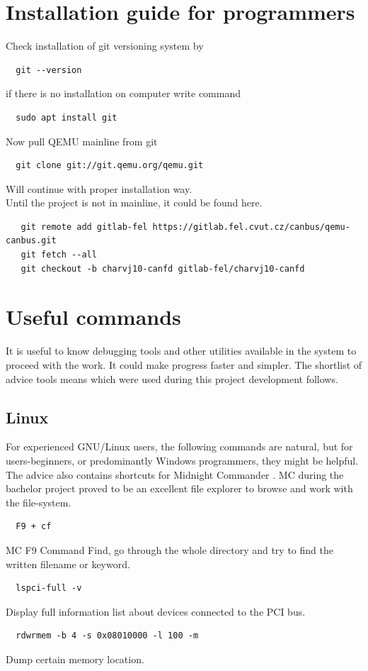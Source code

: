 \documentclass{ctuthesis}
\begin{document}
\appendix
\chapter{Installation guide for programmers}
  Check installation of git versioning system by
  \begin{verbatim}  git --version\end{verbatim}
  if there is no installation on computer write command
  \begin{verbatim}  sudo apt install git\end{verbatim}
  Now pull QEMU mainline from git
 \begin{verbatim}  git clone git://git.qemu.org/qemu.git\end{verbatim}
  Will continue with proper installation way. \\
  Until the project is not in mainline, it could be found here.
  \begin{verbatim}   git remote add gitlab-fel https://gitlab.fel.cvut.cz/canbus/qemu-canbus.git
   git fetch --all
   git checkout -b charvj10-canfd gitlab-fel/charvj10-canfd\end{verbatim}

\chapter{Useful commands}
  It is useful to know debugging tools and other utilities available in the system to proceed with the work. It could make progress faster and simpler. The shortlist of advice tools means  which were used during this project development follows.
 \section{Linux}
  For experienced GNU/Linux users, the following commands are natural, but for users-beginners, or predominantly Windows programmers, they might be helpful. The advice also contains shortcuts for Midnight Commander \cite{mc}. MC during the bachelor project proved to be an excellent file explorer to browse and work with the file-system.
  \begin{verbatim}  F9 + cf\end{verbatim}
  MC F9 Command Find, go through the whole directory and try to find the written filename or keyword.
  \begin{verbatim}  lspci-full -v\end{verbatim}
  Display full information list about devices connected to the PCI bus.
  \begin{verbatim}  rdwrmem -b 4 -s 0x08010000 -l 100 -m\end{verbatim}
  Dump certain memory location. \cite{rdwrmem}

 
\end{document}
